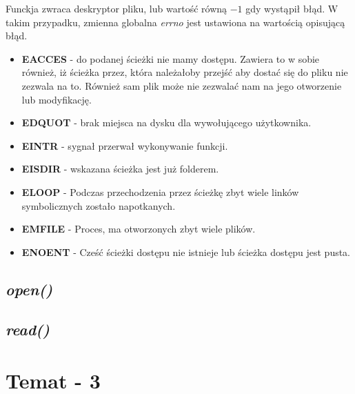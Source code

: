 \documentclass{article}
\begin{document}
Funckja zwraca deskryptor pliku, lub wartość równą $-1$ gdy wystąpił błąd.
W takim przypadku, zmienna globalna \textit{errno} jest ustawiona na wartością opisującą błąd.
\begin{itemize}
\item \textbf{EACCES} - do podanej ścieżki nie mamy dostępu. Zawiera to w sobie również,
iż ścieżka przez, która należałoby przejść aby dostać się do pliku nie zezwala na to.
Również sam plik może nie zezwalać nam na jego otworzenie lub modyfikację.
\item \textbf{EDQUOT} - brak miejsca na dysku dla wywołującego użytkownika.
\item \textbf{EINTR} - sygnał przerwał wykonywanie funkcji.
\item \textbf{EISDIR} - wskazana ścieżka jest już folderem.
\item \textbf{ELOOP} - Podczas przechodzenia przez ścieżkę zbyt wiele linków symbolicznych zostało napotkanych.
\item \textbf{EMFILE} - Proces, ma otworzonych zbyt wiele plików.
\item \textbf{ENOENT} - Cześć ścieżki dostępu nie istnieje lub ścieżka dostępu jest pusta.
\end{itemize}

\subsection{\textit{open()}}
\subsection{\textit{read()}}

\section{Temat - 3}
\end{document}
